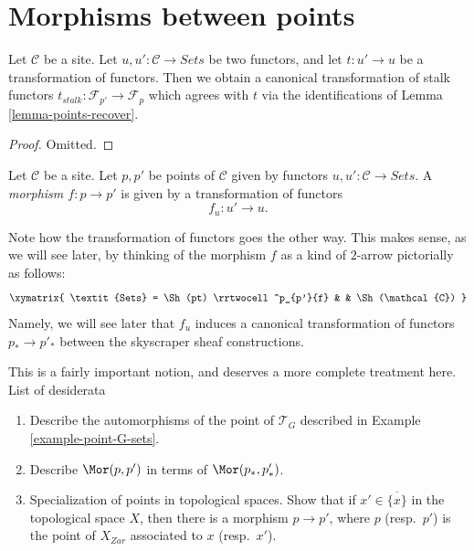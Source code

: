 \section{Morphisms between points}
\label{section-morphisms-points}

\begin{lemma}
\label{lemma-maps-u-points}
Let $\mathcal{C}$ be a site.
Let $u, u' : \mathcal{C} \to \textit{Sets}$ be two
functors, and let $t : u' \to u$ be a transformation of functors.
Then we obtain a canonical transformation of stalk
functors $t_{stalk} : \mathcal{F}_{p'} \to \mathcal{F}_p$
which agrees with $t$ via the identifications of
Lemma \ref{lemma-points-recover}.
\end{lemma}

\begin{proof}
Omitted.
\end{proof}

\begin{definition}
\label{definition-morphism-points}
Let $\mathcal{C}$ be a site. Let $p, p'$ be points of $\mathcal{C}$
given by functors $u, u' : \mathcal{C} \to \textit{Sets}$.
A {\it morphism $f : p \to p'$} is given by a transformation of
functors
$$
f_u : u' \to u.
$$
\end{definition}

\noindent
Note how the transformation of functors goes the other way.
This makes sense, as we will see later, by thinking of
the morphism $f$ as a kind of $2$-arrow pictorially as
follows:
$$
\xymatrix{
\textit{Sets}
=
\Sh(pt)
\rrtwocell^p_{p'}{f}
&
&
\Sh(\mathcal{C})
}
$$
Namely, we will see later that $f_u$ induces a canonical
transformation of functors $p_* \to p'_*$ between
the skyscraper sheaf constructions.

\medskip\noindent
This is a fairly important notion, and deserves a more complete
treatment here. List of desiderata
\begin{enumerate}
\item Describe the automorphisms of the point of $\mathcal{T}_G$
described in Example \ref{example-point-G-sets}.
\item Describe $\Mor(p, p')$ in terms of  $\Mor(p_*, p'_*)$.
\item Specialization of points in topological spaces.
Show that if $x' \in \overline{\{x\}}$ in the topological space
$X$, then there is a morphism $p \to p'$, where $p$ (resp.\ $p'$)
is the point of $X_{Zar}$ associated to $x$ (resp.\ $x'$).
\end{enumerate}




